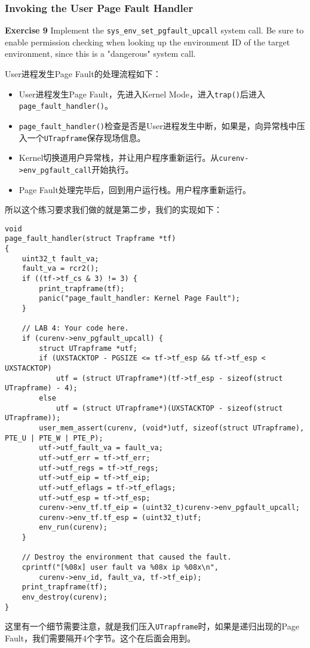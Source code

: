 \documentclass[11pt]{article}
\begin{document}
\subsubsection{Invoking the User Page Fault Handler}
\begin{framed}
\noindent\textbf{Exercise 9} Implement the \lstinline|sys_env_set_pgfault_upcall| system call. Be sure to enable permission checking when looking up the environment ID of the target environment, since this is a "dangerous" system call.
\end{framed}
User进程发生Page Fault的处理流程如下：
\begin{itemize}
\item User进程发生Page Fault，先进入Kernel Mode，进入\lstinline|trap()|后进入\lstinline|page_fault_handler()|。
\item \lstinline|page_fault_handler()|检查是否是User进程发生中断，如果是，向异常栈中压入一个\lstinline|UTrapframe|保存现场信息。
\item Kernel切换道用户异常栈，并让用户程序重新运行。从\lstinline|curenv->env_pgfault_call|开始执行。
\item Page Fault处理完毕后，回到用户运行栈。用户程序重新运行。
\end{itemize}
所以这个练习要求我们做的就是第二步，我们的实现如下：
\begin{lstlisting}[title=env/trap.c]
void
page_fault_handler(struct Trapframe *tf)
{
	uint32_t fault_va;
	fault_va = rcr2();
	if ((tf->tf_cs & 3) != 3) {
		print_trapframe(tf);
		panic("page_fault_handler: Kernel Page Fault");
	}

	// LAB 4: Your code here.
	if (curenv->env_pgfault_upcall) {
		struct UTrapframe *utf;
		if (UXSTACKTOP - PGSIZE <= tf->tf_esp && tf->tf_esp < UXSTACKTOP)
			utf = (struct UTrapframe*)(tf->tf_esp - sizeof(struct UTrapframe) - 4);
		else
			utf = (struct UTrapframe*)(UXSTACKTOP - sizeof(struct UTrapframe));
		user_mem_assert(curenv, (void*)utf, sizeof(struct UTrapframe), PTE_U | PTE_W | PTE_P);
		utf->utf_fault_va = fault_va;
		utf->utf_err = tf->tf_err;
		utf->utf_regs = tf->tf_regs;
		utf->utf_eip = tf->tf_eip;
		utf->utf_eflags = tf->tf_eflags;
		utf->utf_esp = tf->tf_esp;
		curenv->env_tf.tf_eip = (uint32_t)curenv->env_pgfault_upcall;
		curenv->env_tf.tf_esp = (uint32_t)utf;
		env_run(curenv);
	}

	// Destroy the environment that caused the fault.
	cprintf("[%08x] user fault va %08x ip %08x\n",
		curenv->env_id, fault_va, tf->tf_eip);
	print_trapframe(tf);
	env_destroy(curenv);
}
\end{lstlisting}
这里有一个细节需要注意，就是我们压入\lstinline|UTrapframe|时，如果是递归出现的Page Fault，我们需要隔开4个字节。这个在后面会用到。
\end{document}
